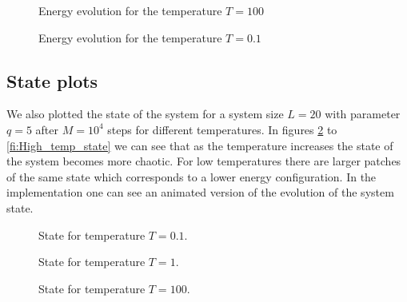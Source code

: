 \begin{figure}
\begin{minipage}[b]{0.4\textwidth}
\centering

\vspace*{-0.5cm}
\caption{Energy evolution for the temperature $T=100$}
\label{pl:HC_test_warm}
\end{minipage}
\hfill
\begin{minipage}[b]{0.4\textwidth}
\centering

\vspace*{-0.5cm}
\caption{Energy evolution for the temperature $T=0.1$}
\label{pl:HC_test_cold}
\end{minipage}
\end{figure}

\subsection{State plots}

We also plotted the state of the system for a system size $L=20$ with parameter $q=5$ after $M=10^4$ steps for different temperatures.
In figures \ref{fi:Low_temp_state} to \ref{fi:High_temp_state} we can see that as the temperature increases the state of the system becomes more chaotic. For low temperatures there are larger patches of the same state which corresponds to a lower energy configuration. In the implementation one can see an animated version of the evolution of the system state.

\begin{figure}
\begin{minipage}{0.25\textwidth}
\centering
\graphicspath{{../../Plots/}}

\caption{State for temperature $T=0.1$.}
\label{fi:High_temp_state}
\end{minipage}
\hfill
\begin{minipage}{0.25\textwidth}
\centering
\graphicspath{{../../Plots/}}

\caption{State for temperature $T=1$.}
\label{fi:Medium_temp_state}
\end{minipage}
\hfill
\begin{minipage}{0.25\textwidth}
\centering
\graphicspath{{../../Plots/}}

\caption{State for temperature $T=100$.}
\label{fi:Low_temp_state}
\end{minipage}
\end{figure}



